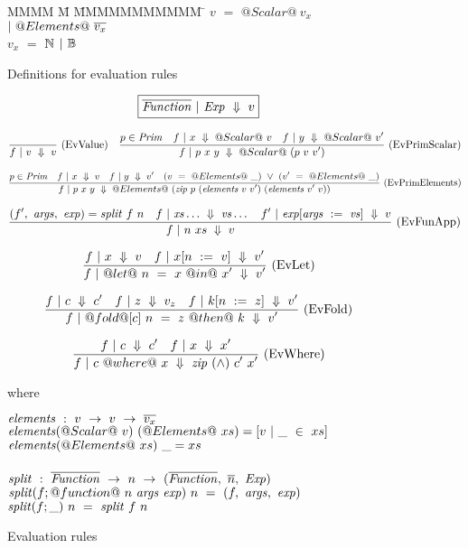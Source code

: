 
\begin{figure}
\begin{tabbing}
MMMM \= M \= MMMMMMMMMMM \= \kill
$v$  \> $=$ \> $@Scalar@~v_x$ \> $|~ @Elements@~\overline{v_x}$ \\
$v_x$\> $=$ \> $\mathbb{N}$ \> $|~ \mathbb{B}$ \\
\end{tabbing}

\caption{Definitions for evaluation rules}
\label{fig:source:eval}
\end{figure}

\begin{figure*}

$$
\boxed{\overline{\mathit{Function}} ~|~ \mathit{Exp} ~\Downarrow~ v}
$$

$$
\frac {\displaystyle 
} {\displaystyle 
    f ~|~ v ~\Downarrow~ v
} \ 
\textrm{(EvValue)}
\quad
\frac {\displaystyle 
    p \in \mathit{Prim}
    \quad
    f ~|~ x ~\Downarrow~ @Scalar@~v
    \quad
    f ~|~ y ~\Downarrow~ @Scalar@~v'
} {\displaystyle 
    f ~|~ p~x~y ~\Downarrow~ @Scalar@~(p~v~v')
} \ 
\textrm{(EvPrimScalar)}
$$

$$
\frac {\displaystyle 
    p \in \mathit{Prim}
    \quad
    f ~|~ x ~\Downarrow~ v
    \quad
    f ~|~ y ~\Downarrow~ v'
    \quad
    (v~=~@Elements@~\_)~\vee~(v'~=~@Elements@~\_)
} {\displaystyle 
    f ~|~ p~x~y ~\Downarrow~ @Elements@~(\mathit{zip}~p~(\mathit{elements}~v~v')~(\mathit{elements}~v'~v))
} \ 
\textrm{(EvPrimElements)}
$$

$$
\frac {\displaystyle 
    (f',~\mathit{args},~\mathit{exp}) = \mathit{split}~f~n
    \quad
    f ~|~ \mathit{xs}\ldots ~\Downarrow~ \mathit{vs}\ldots
    \quad
    f' ~|~ \mathit{exp}[\mathit{args}~:=~\mathit{vs}] ~\Downarrow~ v
} {\displaystyle 
    f ~|~ n~xs ~\Downarrow~ v
} \ 
\textrm{(EvFunApp)}
$$

$$
\frac {\displaystyle 
    f ~|~ x ~\Downarrow~ v
    \quad
    f ~|~ x[n~:=~v] ~\Downarrow~ v'
} {\displaystyle 
    f ~|~ @let@~n~=~x~@in@~x' ~\Downarrow~ v'
} \ 
\textrm{(EvLet)}
$$

$$
\frac {\displaystyle 
    f ~|~ c ~\Downarrow~ c'
    \quad
    f ~|~ z ~\Downarrow~ v_z
    \quad
    f ~|~ k[n~:=~z] ~\Downarrow~ v'
} {\displaystyle 
    f ~|~ @fold@[c]~n~=~z~@then@~k ~\Downarrow~ v'
} \ 
\textrm{(EvFold)}
$$

$$
\frac {\displaystyle 
    f ~|~ c ~\Downarrow~ c'
    \quad
    f ~|~ x ~\Downarrow~ x'
} {\displaystyle 
    f ~|~ c~@where@~x ~\Downarrow~ \mathit{zip}~(\wedge)~c'~x'
} \ 
\textrm{(EvWhere)}
$$


where
\begin{tabbing}
$\mathit{elements}~:~v~\to~v~\to~\overline{v_x}$\\
$\mathit{elements} (@Scalar@~v)~(@Elements@~xs) = [v~|~\_~\in~xs]$\\
$\mathit{elements} (@Elements@~xs)~\_ = xs$\\
\\
$\mathit{split}~:~\overline{\mathit{Function}}~\to~n~\to~(\overline{\mathit{Function}},~\overline{n},~\mathit{Exp})$\\
$\mathit{split} (f;@function@~n~\mathit{args}~\mathit{exp})~n~=~(f,~\mathit{args},~\mathit{exp})$ \\
$\mathit{split} (f;\_)~n~=~\mathit{split}~f~n$ \\
\end{tabbing}

\caption{Evaluation rules}
\label{fig:source:eval}
\end{figure*}


